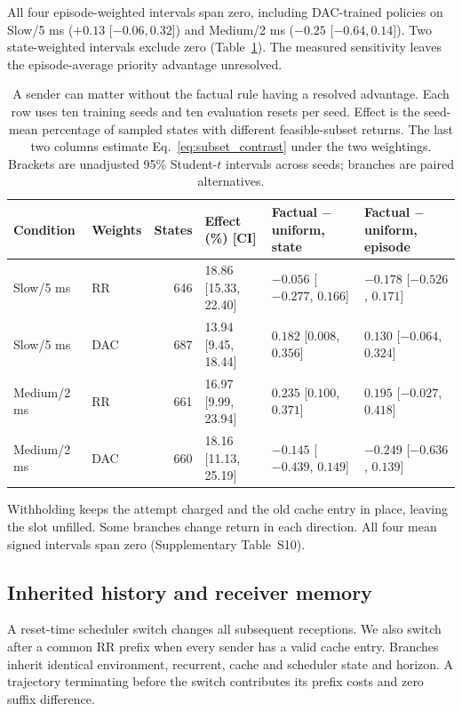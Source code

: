 \documentclass[pdflatex,sn-mathphys-num]{sn-jnl}
\begin{document}
All four episode-weighted intervals span zero, including DAC-trained policies on Slow/5 ms ($+0.13$ [$-0.06,0.32$]) and Medium/2 ms ($-0.25$ [$-0.64,0.14$]). Two state-weighted intervals exclude zero (Table~\ref{tab:sender_weighting}). The measured sensitivity leaves the episode-average priority advantage unresolved.
\begin{table}[htbp]\centering\normalsize
\setlength{\tabcolsep}{4pt}
\caption{A sender can matter without the factual rule having a resolved advantage. Each row uses ten training seeds and ten evaluation resets per seed. Effect is the seed-mean percentage of sampled states with different feasible-subset returns. The last two columns estimate Eq.~\eqref{eq:subset_contrast} under the two weightings. Brackets are unadjusted 95\% Student-$t$ intervals across seeds; branches are paired alternatives.}\label{tab:sender_weighting}
{\footnotesize\setlength{\tabcolsep}{1.3pt}\begin{tabular}{llrlll}\toprule
Condition & Weights & States & Effect (\%) [CI] & Factual $-$ uniform, state & Factual $-$ uniform, episode\\\midrule
Slow/5 ms & RR & 646 & 18.86 [15.33, 22.40] & $-0.056$ [$-0.277$, $0.166$] & $-0.178$ [$-0.526$, $0.171$]\\
Slow/5 ms & DAC & 687 & 13.94 [9.45, 18.44] & $0.182$ [$0.008$, $0.356$] & $0.130$ [$-0.064$, $0.324$]\\
Medium/2 ms & RR & 661 & 16.97 [9.99, 23.94] & $0.235$ [$0.100$, $0.371$] & $0.195$ [$-0.027$, $0.418$]\\
Medium/2 ms & DAC & 660 & 18.16 [11.13, 25.19] & $-0.145$ [$-0.439$, $0.149$] & $-0.249$ [$-0.636$, $0.139$]\\
\bottomrule\end{tabular}}
\end{table}

Withholding keeps the attempt charged and the old cache entry in place, leaving the slot unfilled. Some branches change return in each direction. All four mean signed intervals span zero (Supplementary Table~S10).

\subsection{Inherited history and receiver memory}\label{sec:history}
A reset-time scheduler switch changes all subsequent receptions. We also switch after a common RR prefix when every sender has a valid cache entry. Branches inherit identical environment, recurrent, cache and scheduler state and horizon. A trajectory terminating before the switch contributes its prefix costs and zero suffix difference.
\end{document}
